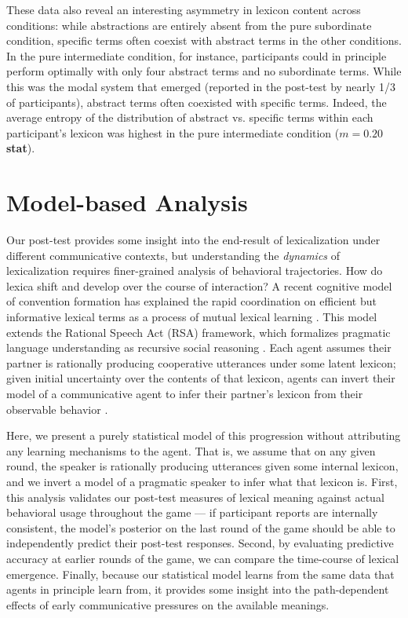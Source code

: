 \documentclass[10pt,letterpaper]{article}
\begin{document}
These data also reveal an interesting asymmetry in lexicon content across conditions: while abstractions are entirely absent from the pure subordinate condition, specific terms often coexist with abstract terms in the other conditions. In the pure intermediate condition, for instance, participants could in principle perform optimally with only four abstract terms and no subordinate terms. While this was the modal system that emerged (reported in the post-test by nearly 1/3 of participants), abstract terms often coexisted with specific terms. Indeed, the average entropy of the distribution of abstract vs. specific terms within each participant's lexicon was highest in the pure intermediate condition ($m = 0.20$ \textbf{stat}). 

\section{Model-based Analysis}

Our post-test provides some insight into the end-result of lexicalization under different communicative contexts, but understanding the \emph{dynamics} of lexicalization requires finer-grained analysis of behavioral trajectories. How do lexica shift and develop over the course of interaction? A recent cognitive model of convention formation has explained the rapid coordination on efficient but informative lexical terms as a process of mutual lexical learning \cite{HawkinsFrankGoodman17_ConventionFormation}. This model extends the Rational Speech Act (RSA) framework, which formalizes pragmatic language understanding as recursive social reasoning \cite{FrankGoodman12_PragmaticReasoningLanguageGames,GoodmanFrank16_RSATiCS}. Each agent assumes their partner is rationally producing cooperative utterances under some latent lexicon; given initial uncertainty over the contents of that lexicon, agents can invert their model of a communicative agent to infer their partner's lexicon from their observable behavior \cite{BergenLevyGoodman16_LexicalUncertainty}. 

Here, we present a purely statistical model of this progression without attributing any learning mechanisms to the agent. That is, we assume that on any given round, the speaker is rationally producing utterances given some internal lexicon, and we invert a model of a pragmatic speaker to infer what that lexicon is. First, this analysis validates our post-test measures of lexical meaning against actual behavioral usage throughout the game --- if participant reports are internally consistent, the model's posterior on the last round of the game should be able to independently predict their post-test responses. Second, by evaluating predictive accuracy at earlier rounds of the game, we can compare the time-course of lexical emergence. Finally, because our statistical model learns from the same data that agents in principle learn from, it provides some insight into the path-dependent effects of early communicative pressures on the available meanings. %
\end{document}
